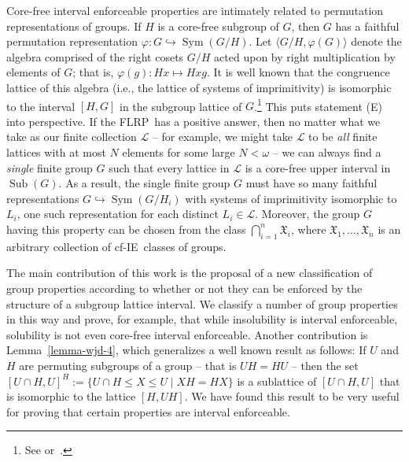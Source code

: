\documentclass[11pt]{amsart}
\theoremstyle{plain}
\theoremstyle{definition}
\theoremstyle{remark}
\numberwithin{theorem}{section}
\numberwithin{claim}{section}
\numberwithin{equation}{section}
\numberwithin{conjecture}{section}
\newcommand{\<}{\ensuremath{\langle}}
\renewcommand{\>}{\ensuremath{\rangle}}
\renewcommand{\leq}{\ensuremath{\leqslant}}
\newcommand{\Con}{\ensuremath{\operatorname{Con}}}
\newcommand{\Sub}{\ensuremath{\operatorname{Sub}}}
\newcommand{\Sym}{\ensuremath{\operatorname{Sym}}}
\newcommand{\FLRP}{{\small FLRP}}
\newcommand{\0}{\ensuremath{\mathbf{0}}}
\newcommand{\1}{\ensuremath{\mathbf{1}}}
\newcommand{\2}{\ensuremath{\mathbf{2}}}
\newcommand{\3}{\ensuremath{\mathbf{3}}}
\newcommand{\4}{\ensuremath{\mathbf{4}}}
\newcommand{\5}{\ensuremath{\mathbf{5}}}
\newcommand{\sG}{\ensuremath{\mathfrak{X}}}
\newcommand{\sL}{\ensuremath{\mathscr{L}}}
\newcommand{\IE}{{\small IE}}
\renewcommand{\phi}{\ensuremath{\varphi}}
\begin{document}
Core-free interval enforceable properties are intimately related to permutation
representations of groups.   
If $H$ is a core-free subgroup of $G$, then $G$ has a faithful permutation 
representation $\phi:G\hookrightarrow \Sym(G/H)$.
Let $\<G/H, \phi(G)\>$ denote the algebra comprised of the right cosets
$G/H$ acted upon by right multiplication by elements of $G$; that is,
$\phi(g): Hx \mapsto Hxg$.  It is
well known that the congruence lattice of this algebra (i.e., the lattice of
systems of imprimitivity) %
 is isomorphic to the interval $[H, G]$ in the subgroup
lattice of $G$.\footnote{See \cite[Lemma 4.20]{alvi:1987}
or~\cite[Theorem 1.5A]{Dixon:1996}.}
This puts statement (E) into perspective.
If the \FLRP\ has a positive answer, then no matter 
what we take as our finite collection $\sL$ -- for example, we
might take $\sL$ to be \emph{all} finite lattices with
at most $N$ elements for some large $N< \omega$ -- we can always find a \emph{single}
finite group $G$ such that every lattice in $\sL$ is a core-free upper interval in
$\Sub(G)$.
As a result, the single finite group $G$ must have so many faithful
representations  $G\hookrightarrow \Sym(G/H_i)$ with systems of imprimitivity
isomorphic to $L_i$,
one such
representation for each distinct $L_i\in \sL$.  Moreover, the group $G$ having
this property can be chosen from the class $\bigcap\limits_{i=1}^n \sG_i$, where 
$\sG_1, \dots, \sG_n$ is an arbitrary collection of cf-\IE\ classes of groups.

The main contribution of this work is the proposal of a new classification
of group properties according to whether or not they can be enforced by the
structure of a subgroup lattice interval.  We classify a number of group
properties in this way and prove, for example, that while insolubility is interval
enforceable, solubility is not even core-free interval enforceable.  Another
contribution is Lemma~\ref{lemma-wjd-4}, which generalizes a well known result
as follows:
If $U$ and $H$ are permuting subgroups of a group -- that is $UH = HU$ -- then
the set $[U\cap H, U]^H :=\{U\cap H \leq X\leq U \mid XH = HX\}$ 
is a sublattice of $[U\cap H, U]$ that is isomorphic to the lattice $[H, UH]$.
We have found this result to be very useful
for proving that certain properties are interval enforceable.
\end{document}
